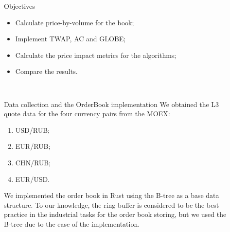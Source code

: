 \documentclass[]{beamer}
\begin{document}
\begin{frame}[t]
\begin{columns}[t]
\begin{column}{\onecolwid}
\begin{alertblock}{Objectives}
\begin{itemize}
    	\item Calculate price-by-volume for the book;

    	\item Implement TWAP, AC and GLOBE;

    	\item Calculate the price impact metrics for the algorithms;

    	\item Compare the results.
    \end{itemize}
    
    \end{alertblock}


    \

    \begin{block}{Data collection and the OrderBook implementation}
        We obtained the L3 quote data for the four currency pairs from the MOEX:
        \begin{enumerate}
            \item USD/RUB; 
            \item EUR/RUB; 
            \item CHN/RUB;
            \item EUR/USD.
        \end{enumerate} 
        We implemented the order book in Rust using the B-tree as a base data structure. To our knowledge, 
        the ring buffer is considered to be the best practice in the industrial tasks for the order book storing, but we used 
        the B-tree due to the ease of the implementation.
    \end{block}



    
    
    \end{column} %
    
    \begin{column}{\sepwid}\end{column} %
    
    \begin{column}{\twocolwid} %
    
    \begin{columns}[t,totalwidth=\twocolwid] %
    
    \begin{column}{\onecolwid}\vspace{-.6in} %
    

\end{column}
\end{columns}
\end{column}
\end{columns}
\end{frame}
\end{document}
